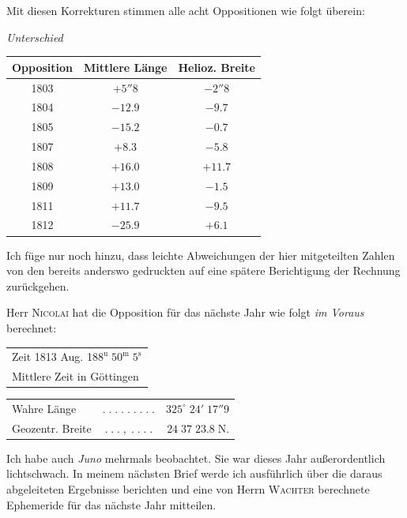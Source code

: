 \noindent Mit diesen Korrekturen stimmen alle acht Oppositionen wie folgt überein:

\begin{center}
\emph{Unterschied}
\end{center}

\begin{center}
\fontsize{10}{12}\selectfont\setlength{\tabcolsep}{6pt}\renewcommand{\arraystretch}{1.15}\begin{tabular}{c|c|c}
Opposition & Mittlere Länge & Helioz. Breite \\
\hline
1803 & $+5''8$ & $-2''8$ \\
1804 & $-12.9$ & $-9.7$ \\
1805 & $-15.2$ & $-0.7$ \\
1807 & $+8.3$ & $-5.8$ \\
1808 & $+16.0$ & $+11.7$ \\
1809 & $+13.0$ & $-1.5$ \\
1811 & $+11.7$ & $-9.5$ \\
1812 & $-25.9$ & $+6.1$ \\
\end{tabular}
\end{center}

\par\indent Ich füge nur noch hinzu, dass leichte Abweichungen der hier mitgeteilten Zahlen von den bereits anderswo gedruckten auf eine spätere Berichtigung der Rechnung zurückgehen.

\par\indent Herr \textsc{Nicolai} hat die Opposition für das nächste Jahr wie folgt \emph{im Voraus} berechnet:
\begin{center}\fontsize{10}{12}\selectfont\setlength{\tabcolsep}{0pt}\renewcommand{\arraystretch}{1.15}\begin{tabular}{l}
Zeit 1813 Aug. 18\quad $8^{\mathrm u}\;50^{\mathrm m}\;5^{\mathrm s}$\\Mittlere Zeit in Göttingen
\end{tabular}\end{center}
\begin{center}\fontsize{10}{12}\selectfont\setlength{\tabcolsep}{2pt}\renewcommand{\arraystretch}{1.15}\begin{tabular}{lcr}
Wahre Länge & $.\;.\;.\;.\;.\;.\;.\;.\;.$ & $325^\circ\;24'\;17''9$\\
Geozentr. Breite & $.\;.\;.\;,\;.\;.\;.\;.$ & $24\;37\;23.8\;\mathrm{N}.$\\
\end{tabular}\end{center}

\par\indent Ich habe auch \emph{Juno} mehrmals beobachtet. Sie war dieses Jahr außerordentlich lichtschwach. In meinem nächsten Brief werde ich ausführlich über die daraus abgeleiteten Ergebnisse berichten und eine von Herrn \textsc{Wachter} berechnete Ephemeride für das nächste Jahr mitteilen.
